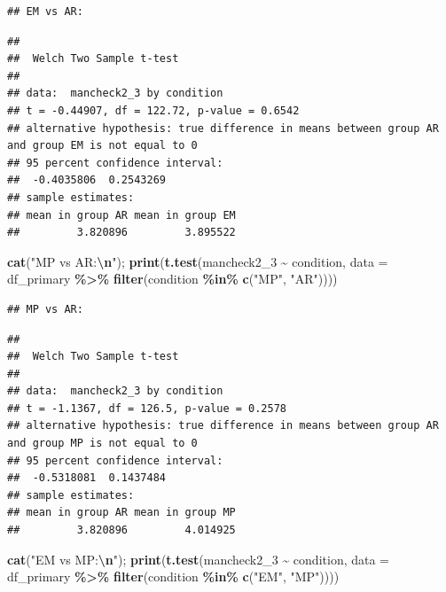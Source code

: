 \documentclass[
]{article}
\newenvironment{Shaded}{\begin{snugshade}}{\end{snugshade}}
\newcommand{\AttributeTok}[1]{\textcolor[rgb]{0.13,0.29,0.53}{#1}}
\newcommand{\FunctionTok}[1]{\textcolor[rgb]{0.13,0.29,0.53}{\textbf{#1}}}
\newcommand{\NormalTok}[1]{#1}
\newcommand{\SpecialCharTok}[1]{\textcolor[rgb]{0.81,0.36,0.00}{\textbf{#1}}}
\newcommand{\StringTok}[1]{\textcolor[rgb]{0.31,0.60,0.02}{#1}}
\begin{document}
\begin{verbatim}
## EM vs AR:
\end{verbatim}

\begin{verbatim}
## 
##  Welch Two Sample t-test
## 
## data:  mancheck2_3 by condition
## t = -0.44907, df = 122.72, p-value = 0.6542
## alternative hypothesis: true difference in means between group AR and group EM is not equal to 0
## 95 percent confidence interval:
##  -0.4035806  0.2543269
## sample estimates:
## mean in group AR mean in group EM 
##         3.820896         3.895522
\end{verbatim}

\begin{Shaded}
\begin{Highlighting}[]
\FunctionTok{cat}\NormalTok{(}\StringTok{"MP vs AR:}\SpecialCharTok{\textbackslash{}n}\StringTok{"}\NormalTok{); }\FunctionTok{print}\NormalTok{(}\FunctionTok{t.test}\NormalTok{(mancheck2\_3 }\SpecialCharTok{\textasciitilde{}}\NormalTok{ condition, }
       \AttributeTok{data =}\NormalTok{ df\_primary }\SpecialCharTok{\%\textgreater{}\%} \FunctionTok{filter}\NormalTok{(condition }\SpecialCharTok{\%in\%} \FunctionTok{c}\NormalTok{(}\StringTok{"MP"}\NormalTok{, }\StringTok{"AR"}\NormalTok{))))}
\end{Highlighting}
\end{Shaded}

\begin{verbatim}
## MP vs AR:
\end{verbatim}

\begin{verbatim}
## 
##  Welch Two Sample t-test
## 
## data:  mancheck2_3 by condition
## t = -1.1367, df = 126.5, p-value = 0.2578
## alternative hypothesis: true difference in means between group AR and group MP is not equal to 0
## 95 percent confidence interval:
##  -0.5318081  0.1437484
## sample estimates:
## mean in group AR mean in group MP 
##         3.820896         4.014925
\end{verbatim}

\begin{Shaded}
\begin{Highlighting}[]
\FunctionTok{cat}\NormalTok{(}\StringTok{"EM vs MP:}\SpecialCharTok{\textbackslash{}n}\StringTok{"}\NormalTok{); }\FunctionTok{print}\NormalTok{(}\FunctionTok{t.test}\NormalTok{(mancheck2\_3 }\SpecialCharTok{\textasciitilde{}}\NormalTok{ condition, }
       \AttributeTok{data =}\NormalTok{ df\_primary }\SpecialCharTok{\%\textgreater{}\%} \FunctionTok{filter}\NormalTok{(condition }\SpecialCharTok{\%in\%} \FunctionTok{c}\NormalTok{(}\StringTok{"EM"}\NormalTok{, }\StringTok{"MP"}\NormalTok{))))}
\end{Highlighting}
\end{Shaded}
\end{document}
